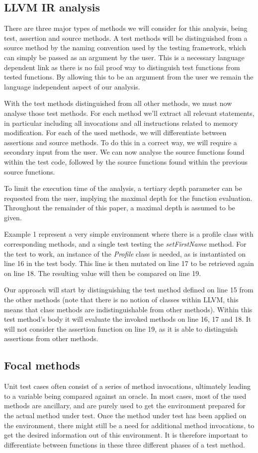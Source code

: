 \documentclass[11pt]{article}
\begin{document}
\begin{multicols}{2}
\subsection{LLVM IR analysis}
There are three major types of methods we will consider for this analysis, being test, assertion and source methods. A test methods will be distinguished from a source method by the naming convention used by the testing framework, which can simply be passed as an argument by the user. This is a necessary language dependent link as there is no fail proof way to distinguish test functions from tested functions. By allowing this to be an argument from the user we remain the language independent aspect of our analysis.

With the test methods distinguished from all other methods, we must now analyse those test methods. For each method we'll extract all relevant statements, in particular including all invocations and all instructions related to memory modification. For each of the used methods, we will differentiate between assertions and source methods. To do this in a correct way, we will require a secondary input from the user. We can now analyse the source functions found within the test code, followed by the source functions found within the previous source functions.

To limit the execution time of the analysis, a tertiary depth parameter can be requested from the user, implying the maximal depth for the function evaluation. Throughout the remainder of this paper, a maximal depth is assumed to be given.

Example 1 represent a very simple environment where there is a profile class with corresponding methods, and a single test testing the \textit{setFirstName} method. For the test to work, an instance of the \textit{Profile} class is needed, as is instantiated on line 16 in the test body. This line is then mutated on line 17 to be retrieved again on line 18. The resulting value will then be compared on line 19. 

Our approach will start by distinguishing the test method defined on line 15 from the other methods (note that there is no notion of classes within LLVM, this means that class methods are indistinguishable from other methods). Within this test method's body it will evaluate the invoked methods on line 16, 17 and 18. It will not consider the assertion function on line 19, as it is able to distinguish assertions from other methods.

\subsection{Focal methods}
Unit test cases often consist of a series of method invocations, ultimately leading to a variable being compared against an oracle. In most cases, most of the used methods are ancillary, and are purely used to get the environment prepared for the actual method under test. Once the method under test has been applied on the environment, there might still be a need for additional method invocations, to get the desired information out of this environment. It is therefore important to differentiate between functions in these three different phases of a test method.


\end{multicols}
\end{document}
